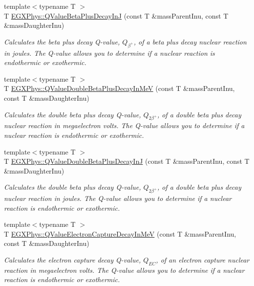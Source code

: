 \begin{DoxyCompactItemize}
{\footnotesize template$<$typename T $>$ }\\T \hyperlink{group___e_g_x_phys-_q_value_ga066fe9a9816a204c801c557a85bc60df}{E\+G\+X\+Phys\+::\+Q\+Value\+Beta\+Plus\+Decay\+InJ} (const T \&mass\+Parent\+Inu, const T \&mass\+Daughter\+Inu)
\begin{DoxyCompactList}\small\item\em Calculates the beta plus decay Q-\/value, $Q_{\beta^+}$, of a beta plus decay nuclear reaction in joules. The Q-\/value allows you to determine if a nuclear reaction is endothermic or exothermic. \end{DoxyCompactList}\item 
{\footnotesize template$<$typename T $>$ }\\T \hyperlink{group___e_g_x_phys-_q_value_ga3fb4b374bc1df69b96a66d0488bb2ba1}{E\+G\+X\+Phys\+::\+Q\+Value\+Double\+Beta\+Plus\+Decay\+In\+MeV} (const T \&mass\+Parent\+Inu, const T \&mass\+Daughter\+Inu)
\begin{DoxyCompactList}\small\item\em Calculates the double beta plus decay Q-\/value, $Q_{2\beta^+}$, of a double beta plus decay nuclear reaction in megaelectron volts. The Q-\/value allows you to determine if a nuclear reaction is endothermic or exothermic. \end{DoxyCompactList}\item 
{\footnotesize template$<$typename T $>$ }\\T \hyperlink{group___e_g_x_phys-_q_value_ga7d8dcc2691c2d4de9132e758e149ba51}{E\+G\+X\+Phys\+::\+Q\+Value\+Double\+Beta\+Plus\+Decay\+InJ} (const T \&mass\+Parent\+Inu, const T \&mass\+Daughter\+Inu)
\begin{DoxyCompactList}\small\item\em Calculates the double beta plus decay Q-\/value, $Q_{2\beta^+}$, of a double beta plus decay nuclear reaction in joules. The Q-\/value allows you to determine if a nuclear reaction is endothermic or exothermic. \end{DoxyCompactList}\item 
{\footnotesize template$<$typename T $>$ }\\T \hyperlink{group___e_g_x_phys-_q_value_ga9a6b76207e2ec60fd0ee3511582f9e26}{E\+G\+X\+Phys\+::\+Q\+Value\+Electron\+Capture\+Decay\+In\+MeV} (const T \&mass\+Parent\+Inu, const T \&mass\+Daughter\+Inu)
\begin{DoxyCompactList}\small\item\em Calculates the electron capture decay Q-\/value, $Q_{EC}$, of an electron capture nuclear reaction in megaelectron volts. The Q-\/value allows you to determine if a nuclear reaction is endothermic or exothermic. \end{DoxyCompactList}\item 

\end{DoxyCompactItemize}
